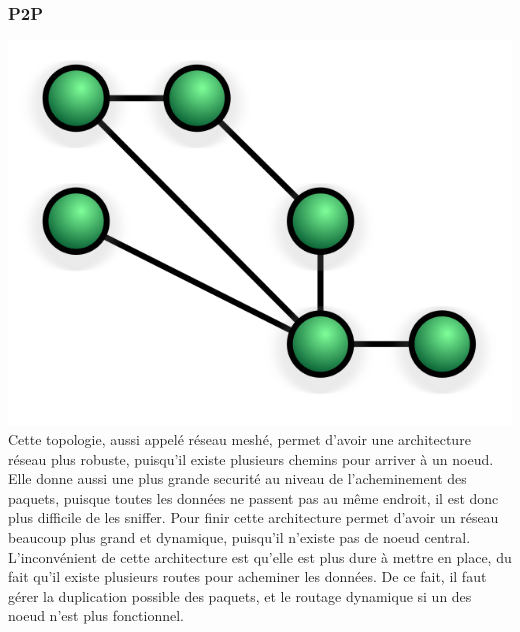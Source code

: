 	    \subsubsection{P2P}
\includegraphics{img/NetworkTopology-Mesh.svg.png}
Cette topologie, aussi appelé réseau meshé, permet d'avoir une architecture réseau plus robuste, puisqu'il 
existe plusieurs chemins pour arriver à un noeud. Elle donne aussi une plus grande securité au niveau de 
l'acheminement des paquets, puisque toutes les données ne passent pas au même endroit, il est donc plus 
difficile de les sniffer. Pour finir cette architecture permet d'avoir un réseau beaucoup plus grand et 
dynamique, puisqu'il n'existe pas de noeud central. L'inconvénient de cette architecture est qu'elle est plus 
dure à mettre en place, du fait qu'il existe plusieurs routes pour acheminer les données. De ce fait, il faut 
gérer la duplication possible des paquets, et le routage dynamique si un des noeud n'est plus fonctionnel.

